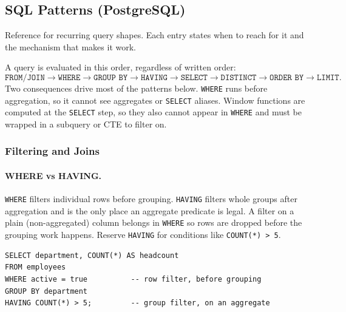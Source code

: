 \subsection{SQL Patterns (PostgreSQL)}

Reference for recurring query shapes. Each entry states when to reach for
it and the mechanism that makes it work.

\begin{keybox}
A query is evaluated in this order, regardless of written order:
\[
  \texttt{FROM/JOIN} \to \texttt{WHERE} \to \texttt{GROUP BY} \to
  \texttt{HAVING} \to \texttt{SELECT} \to \texttt{DISTINCT} \to
  \texttt{ORDER BY} \to \texttt{LIMIT}.
\]
Two consequences drive most of the patterns below. \texttt{WHERE} runs
before aggregation, so it cannot see aggregates or \texttt{SELECT} aliases.
Window functions are computed at the \texttt{SELECT} step, so they also
cannot appear in \texttt{WHERE} and must be wrapped in a subquery or CTE
to filter on.
\end{keybox}

\subsubsection{Filtering and Joins}

\paragraph{WHERE vs HAVING.} \texttt{WHERE} filters individual rows before
grouping. \texttt{HAVING} filters whole groups after aggregation and is the
only place an aggregate predicate is legal. A filter on a plain
(non-aggregated) column belongs in \texttt{WHERE} so rows are dropped before
the grouping work happens. Reserve \texttt{HAVING} for conditions like
\texttt{COUNT(*) > 5}.

\vspace{1.5ex}

\begin{lstlisting}[style=sql, caption={WHERE prunes rows, HAVING prunes groups}]
SELECT department, COUNT(*) AS headcount
FROM employees
WHERE active = true          -- row filter, before grouping
GROUP BY department
HAVING COUNT(*) > 5;         -- group filter, on an aggregate
\end{lstlisting}

\vspace{-2ex}

